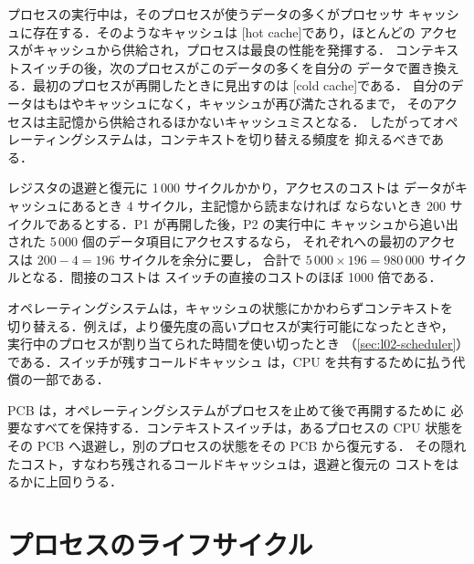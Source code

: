 \documentclass[../main.tex]{subfiles}
\begin{document}
プロセスの実行中は，そのプロセスが使うデータの多くがプロセッサ
キャッシュに存在する．そのようなキャッシュは
[hot cache]であり，ほとんどの
アクセスがキャッシュから供給され，プロセスは最良の性能を発揮する．
コンテキストスイッチの後，次のプロセスがこのデータの多くを自分の
データで置き換える．最初のプロセスが再開したときに見出すのは
[cold cache]である．
自分のデータはもはやキャッシュになく，キャッシュが再び満たされるまで，
そのアクセスは主記憶から供給されるほかないキャッシュミスとなる．
したがってオペレーティングシステムは，コンテキストを切り替える頻度を
抑えるべきである．

\begin{example}
  レジスタの退避と復元に 1\,000 サイクルかかり，アクセスのコストは
  データがキャッシュにあるとき 4 サイクル，主記憶から読まなければ
  ならないとき 200 サイクルであるとする．P1 が再開した後，P2 の実行中に
  キャッシュから追い出された 5\,000 個のデータ項目にアクセスするなら，
  それぞれへの最初のアクセスは $200 - 4 = 196$ サイクルを余分に要し，
  合計で $5\,000\times 196 = 980\,000$ サイクルとなる．間接のコストは
  スイッチの直接のコストのほぼ 1000 倍である．
\end{example}

\begin{note}
  オペレーティングシステムは，キャッシュの状態にかかわらずコンテキストを
  切り替える．例えば，より優先度の高いプロセスが実行可能になったときや，
  実行中のプロセスが割り当てられた時間を使い切ったとき
  （\cref{sec:l02-scheduler}）である．スイッチが残すコールドキャッシュ
  は，CPU を共有するために払う代償の一部である．
\end{note}

\begin{keypoint}
  PCB は，オペレーティングシステムがプロセスを止めて後で再開するために
  必要なすべてを保持する．コンテキストスイッチは，あるプロセスの CPU
  状態をその PCB へ退避し，別のプロセスの状態をその PCB から復元する．
  その隠れたコスト，すなわち残されるコールドキャッシュは，退避と復元の
  コストをはるかに上回りうる．
\end{keypoint}

\section{プロセスのライフサイクル}
\label{sec:l02-states}
\end{document}
